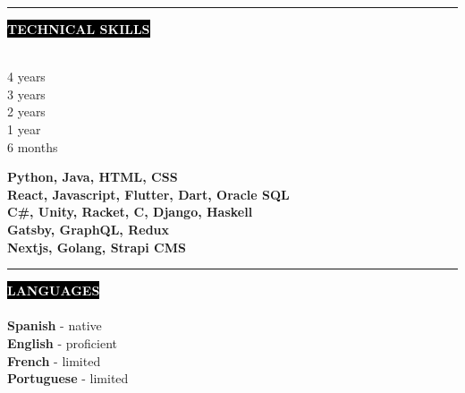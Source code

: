 \documentclass[11pt,A4]{article}
\newcounter{a}
\newcounter{b}
\newcounter{c}
\newcommand{\cvsection}[1] {
	\textcolor{white}{\MakeUppercase{\textbf{#1}}}
}
\newcommand{\cvsect}[1]{
	\colorbox{black}{{\cvsection{#1}}}\\\\%
}
\begin{document}
	\begin{minipage}[t]{0.65\textwidth}\hrule height 0pt width 0pt%
	\cvsect{Technical Skills}
	\begin{minipage}[t]{0.2\textwidth}%
		4 years\\ 3 years \\ 2 years \\ 1 year \\ 6 months
	\end{minipage}%
	\begin{minipage}[t]{0.7\textwidth}%
		\textbf{Python, Java, HTML, CSS} \\ \textbf{React, Javascript, Flutter, Dart, Oracle SQL} \\ \textbf{C\#, Unity, Racket, C, Django, Haskell} \\ \textbf{Gatsby, GraphQL, Redux} \\ \textbf{Nextjs, Golang, Strapi CMS}
	\end{minipage}%
	\end{minipage}%
	\hspace{2cm}
	\begin{minipage}[t]{0.35\textwidth}\hrule height 0pt width 0pt%
		\cvsect{Languages}
		\textbf{Spanish} - native\\
		\textbf{English} - proficient\\
		\textbf{French} - limited\\
		\textbf{Portuguese} - limited\\
	\end{minipage}%
\end{document}
